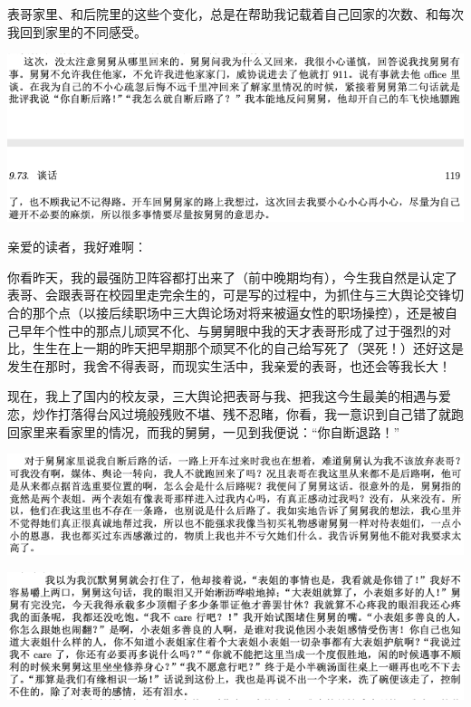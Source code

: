 \documentclass[9pt, b5paper]{article}
\begin{document}
表哥家里、和后院里的这些个变化，总是在帮助我记载着自己回家的次数、和每次我回到家里的不同感受。 

\begin{center}
\includegraphics[width=.9\linewidth]{./pic/p1p119.png}
\end{center}

亲爱的读者，我好难啊：

你看昨天，我的最强防卫阵容都打出来了（前中晚期均有），今生我自然是认定了表哥、会跟表哥在校园里走完余生的，可是写的过程中，为抓住与三大舆论交锋切合的那个点（以接后续职场中三大舆论场对将来被逼女性的职场操控），还是被自己早年个性中的那点儿顽冥不化、与舅舅眼中我的天才表哥形成了过于强烈的对比，生生在上一期的昨天把早期那个顽冥不化的自己给写死了（哭死！）还好这是发生在那时，我舍不得表哥，而现实生活中，我亲爱的表哥，也还会等我长大！

现在，我上了国内的校友录，三大舆论把表哥与我、把我这今生最美的相遇与爱恋，炒作打落得台风过境般残败不堪、残不忍睹，你看，我一意识到自己错了就跑回家里来看家里的情况，而我的舅舅，一见到我便说：“你自断退路！”

\begin{center}
\includegraphics[width=.9\linewidth]{./pic/p1p120-1.png}
\end{center}

\begin{center}
\includegraphics[width=.9\linewidth]{./pic/p1p51-3.png}
\end{center}
\end{document}
